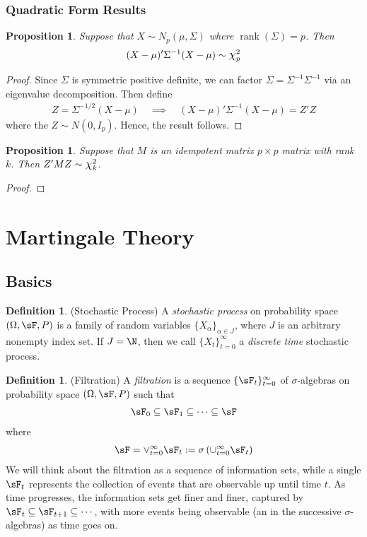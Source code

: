 \documentclass[12pt]{article}
\theoremstyle{plain}
\newtheorem{prop}[thm]{Proposition}
\theoremstyle{definition}
\newtheorem{defn}[thm]{Definition}
\theoremstyle{remark}
\newcommand*{\Chi}{\mbox{\large$\chi$}} %
\newcommand{\rank}{\operatorname{rank}}
\newcommand{\tinfz}{_{t=0}^\infty}
\begin{document}
\clearpage
\subsubsection{Quadratic Form Results}

\begin{prop}
Suppose that $X\sim N_p(\mu,\Sigma)$ where $\rank(\Sigma)=p$. Then
\begin{align*}
  (X-\mu)'\Sigma^{-1}(X-\mu) \sim \Chi_p^2
\end{align*}
\end{prop}
\begin{proof}
Since $\Sigma$ is symmetric positive definite, we can factor
$\Sigma=\Sigma^{-1}\Sigma^{-1}$ via an eigenvalue decomposition. Then
define
\begin{align*}
  Z = \Sigma^{-1/2}(X-\mu)
  \quad\implies\quad
  (X-\mu)'\Sigma^{-1}(X-\mu)
  = Z'Z
\end{align*}
where the $Z\sim N(0,I_p)$. Hence, the result follows.
\end{proof}

\begin{prop}
Suppose that $M$ is an idempotent matrix $p\times p$ matrix with rank
$k$. Then $Z'MZ\sim \Chi^2_k$.
\end{prop}
\begin{proof}
\end{proof}




\clearpage
\section{Martingale Theory}

\subsection{Basics}
\begin{defn}(Stochastic Process)
A \emph{stochastic process} on probability space $(\Omega,\sF,P)$ is a
family of random variables $\{X_\alpha\}_{\alpha\in J}$, where $J$ is an
arbitrary nonempty index set.
If $J=\N$, then we call $\{X_t\}\tinfz$ a \emph{discrete time}
stochastic process.
\end{defn}

\begin{defn}(Filtration)
A \emph{filtration} is a sequence $\{\sF_t\}\tinfz$ of $\sigma$-algebras
on probability space $(\Omega,\sF,P)$ such that
\begin{align*}
  \sF_0 \subseteq \sF_1 \subseteq \cdots \subseteq\sF
\end{align*}
where
\begin{align*}
  \sF = \vee\tinfz \sF_t := \sigma\left(\cup\tinfz \sF_t\right)
\end{align*}
We will think about the filtration as a sequence of information sets,
while a single $\sF_t$ represents the collection of events that are
observable up until time $t$. As time progresses, the information sets
get finer and finer, captured by
$\sF_t\subseteq \sF_{t+1}\subseteq\cdots$, with more events being
observable (an in the successive $\sigma$-algebras) as time goes on.
\end{defn}
\end{document}
